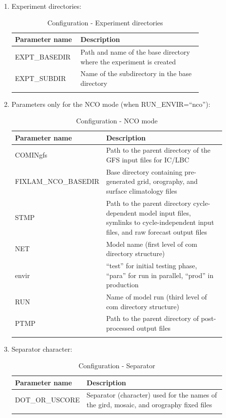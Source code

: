 \documentclass[11pt,fleqn]{report}              %
\begin{document}
\begin{enumerate}
\item Experiment directories:
{
\scriptsize
\begin{longtable}{p{0.2\linewidth} | p{0.6\linewidth} }
\hline
\hline
Parameter name & Description \\
\hline
EXPT\_BASEDIR & Path and name of the base directory where the experiment is created  \\
EXPT\_SUBDIR & Name of the subdirectory in the base directory \\
\hline
\caption{Configuration - Experiment directories }
\label{table:config_expdir}
\end{longtable}
}

\item Parameters only for the NCO mode (when RUN\_ENVIR=``nco''):
{
\scriptsize
\begin{longtable}{p{0.22\linewidth} | p{0.68\linewidth} }
\hline
\hline
Parameter name & Description \\
\hline
COMINgfs & Path to the parent directory of the GFS input files for IC/LBC \\
FIXLAM\_NCO\_BASEDIR & Base directory containing pre-generated grid, orography, and surface climatology files \\
STMP & Path to the parent directory cycle-dependent model input files, symlinks to cycle-independent input files, and raw forecast output files\\
NET & Model name (first level of com directory structure) \\
envir & ``test'' for initial testing phase, ``para'' for run in parallel, ``prod'' in production \\
RUN & Name of model run (third level of com directory structure) \\
PTMP & Path to the parent directory of post-processed output files \\
\hline
\caption{Configuration - NCO mode}
\label{table:config_nco}
\end{longtable}
}

\item Separator character:
{
\scriptsize
\begin{longtable}{p{0.2\linewidth} | p{0.7\linewidth} }
\hline
\hline
Parameter name & Description \\
\hline
DOT\_OR\_USCORE & Separator (character) used for the names of the gird, mosaic, and orography fixed files \\
\hline
\caption{Configuration - Separator }
\label{table:config_separator}
\end{longtable}
}


\end{enumerate}
\end{document}
